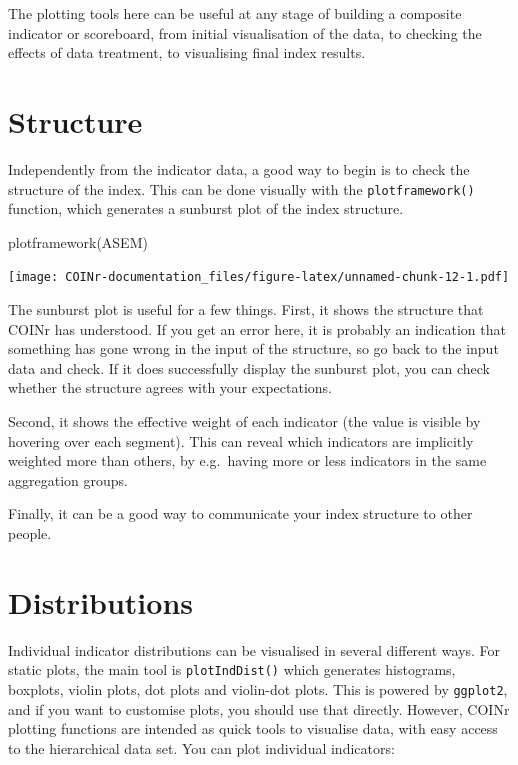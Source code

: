 \documentclass[
]{book}
\newenvironment{Shaded}{\begin{snugshade}}{\end{snugshade}}
\newcommand{\FunctionTok}[1]{\textcolor[rgb]{0.00,0.00,0.00}{#1}}
\newcommand{\NormalTok}[1]{#1}
\begin{document}
The plotting tools here can be useful at any stage of building a composite indicator or scoreboard, from initial visualisation of the data, to checking the effects of data treatment, to visualising final index results.

\hypertarget{structure}{%
\section{Structure}\label{structure}}

Independently from the indicator data, a good way to begin is to check the structure of the index. This can be done visually with the \texttt{plotframework()} function, which generates a sunburst plot of the index structure.

\begin{Shaded}
\begin{Highlighting}[]
\FunctionTok{plotframework}\NormalTok{(ASEM)}
\end{Highlighting}
\end{Shaded}

\texttt{[image: COINr-documentation\_files/figure-latex/unnamed-chunk-12-1.pdf]}

The sunburst plot is useful for a few things. First, it shows the structure that COINr has understood. If you get an error here, it is probably an indication that something has gone wrong in the input of the structure, so go back to the input data and check. If it does successfully display the sunburst plot, you can check whether the structure agrees with your expectations.

Second, it shows the effective weight of each indicator (the value is visible by hovering over each segment). This can reveal which indicators are implicitly weighted more than others, by e.g.~having more or less indicators in the same aggregation groups.

Finally, it can be a good way to communicate your index structure to other people.

\hypertarget{distributions}{%
\section{Distributions}\label{distributions}}

Individual indicator distributions can be visualised in several different ways. For static plots, the main tool is \texttt{plotIndDist()} which generates histograms, boxplots, violin plots, dot plots and violin-dot plots. This is powered by \texttt{ggplot2}, and if you want to customise plots, you should use that directly. However, COINr plotting functions are intended as quick tools to visualise data, with easy access to the hierarchical data set. You can plot individual indicators:
\end{document}
